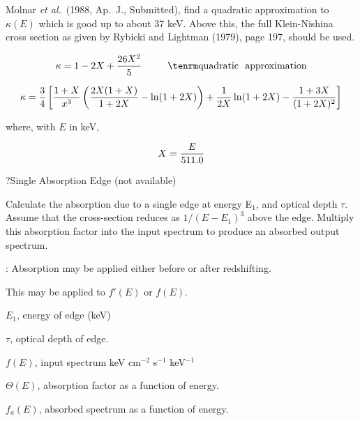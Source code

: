 \itemitem{}Molnar {\it et al.}~(1988, Ap.~J., Submitted), find a quadratic
approximation to $\kappa(E)$ which is good up to about 37 keV.  Above
this,
the full Klein-Nishina cross section as  given by Rybicki and Lightman
(1979), page 197, should be used.

$$\kappa = 1- 2X + {26 X^2 \over 5} ~~~~~~~~{\rm quadratic~~approximation}$$

$$\kappa = {3 \over 4} \left[ {{1+X} \over x^3} \left( {{2 X (1+X)} \over
{1+ 2X} } - \ln (1 + 2X) \right) + {1 \over {2X}} \ln (1+2X)
- {{1+3X} \over (1+2X)^2}\right]$$

\itemitem{}where, with $E$ in keV,

$$X = {E \over 511.0}$$

\centerline{}
\vskip 18pt
\centerline{}

{\parindent
\vbox{}}

\par\vfill\eject
 
\??Single Absorption Edge (not available)

{\listlist
 

Calculate the absorption due to a single edge at energy E$_{1}$, and optical
depth $\tau$.  Assume that the cross-section reduces as $1/(E-E_{1})^{3}$ above
the edge.  Multiply this absorption factor into the input spectrum to produce
an absorbed output spectrum.

:  Absorption may be applied either before or after redshifting.
 
This may be applied to $f'(E)$ or $f(E)$.


$E_1$, energy of edge (keV)

$\tau$, optical depth of edge.

$f(E)$, input spectrum keV cm$^{-2}$ s$^{-1}$ keV$^{-1}$
 
 
$\Theta (E)$, absorption factor as a function of energy.
 
$f_a(E)$, absorbed spectrum as a function of energy.


}

